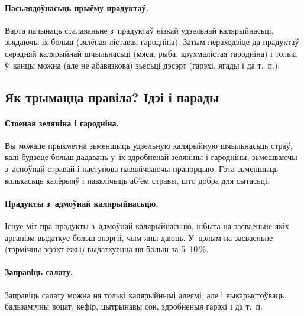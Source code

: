 
\paragraph{Пасьлядоўнасьць прыёму прадуктаў.}
Варта пачынаць сталаваньне з~прадуктаў нізкай удзельнай калярыйнасьці, зьядаючы іх больш (зялёная ліставая гародніна). Затым пераходзіце да прадуктаў сярэдняй калярыйнай шчыльнасьці (мяса, рыба, крухмалістая гародніна) і толькі ў~канцы можна (але не абавязкова) зьесьці дэсэрт (гарэхі, ягады і да т.~п.).

\subsection{Як трымацца правіла? Ідэі і парады}

\paragraph{Стоеная зеляніна і гародніна.}
Вы можаце прыкметна зьменшыць удзельную калярыйную шчыльнасьць страў, калі будзеце больш дадаваць у~іх здробненай зеляніны і гародніны, зьмешваючы з~асноўнай стравай і паступова павялічваючы прапорцыю. Гэта зьменшыць колькасьць калёрыяў і павялічыць аб'ём стравы, што добра для сытасьці.

\paragraph{Прадукты з~адмоўнай калярыйнасьцю.}
Існуе міт пра прадукты з~адмоўнай калярыйнасьцю, нібыта на засваеньне якіх арганізм выдаткуе больш энэргіі, чым яны даюць. У~цэлым на засваеньне (тэрмічны эфэкт ежы) выдаткуецца ня больш за 5--10\,\%.

\paragraph{Заправіць салату.}
Заправіць салату можна ня толькі калярыйнымі алеямі, але і выкарыстоўваць бальзамічны воцат, кефір, цытрынавы сок, здробненыя гарэхі і да т.~п.

